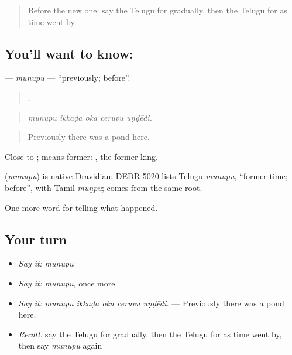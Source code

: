 \label{lesson:TE-C338-munupu}



\begin{quote}
Before the new one: say the Telugu for gradually, then the Telugu for as time went by.
\end{quote}

\subsection*{You'll want to know: }
\textbf{} — \emph{munupu} — \textquotedblleft{}previously; before\textquotedblright{}.

\begin{quote}
    .
\end{quote}

\begin{quote}
\emph{munupu ikkaḍa oka ceruvu uṇḍēdi.}
\end{quote}

\begin{quote}
Previously there was a pond here.
\end{quote}

Close to ;  means former:  , the former king.

\begin{cousinweb}
\textbf{} (\emph{munupu}) is native Dravidian: DEDR 5020 lists Telugu \emph{munupu}, \textquotedblleft{}former time; before\textquotedblright{}, with Tamil \emph{muṉpu};  comes from the same root.
\end{cousinweb}

\begin{grammarlens}[title={What you've built}]
One more word for telling what happened.
\end{grammarlens}

\subsection*{Your turn}
\begin{itemize}
\raggedright
  \item \emph{Say it:} \emph{munupu}
  \item \emph{Say it:} \emph{munupu}, once more
  \item \emph{Say it:} \emph{munupu ikkaḍa oka ceruvu uṇḍēdi.} — Previously there was a pond here.
  \item \emph{Recall:} say the Telugu for gradually, then the Telugu for as time went by, then say \emph{munupu} again
\end{itemize}

